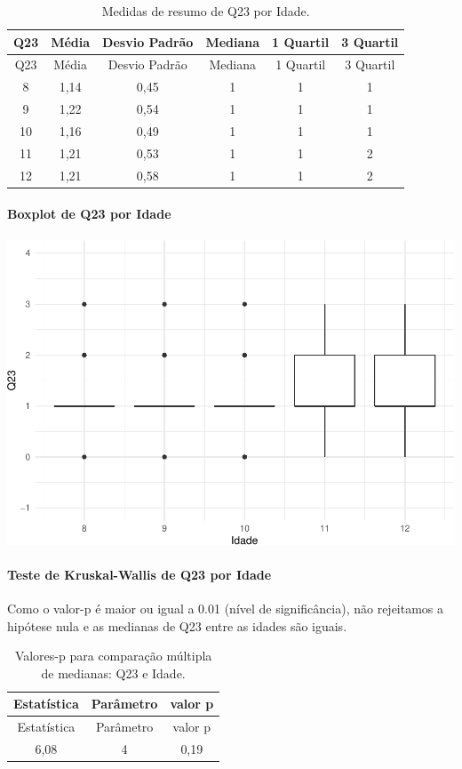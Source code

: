 \documentclass[]{article}
\let\oldparagraph\paragraph
\renewcommand{\paragraph}[1]{\oldparagraph{#1}\mbox{}}
\begin{document}
\begin{longtable}[]{@{}cccccc@{}}
\caption{\label{tab:unnamed-chunk-568}Medidas de resumo de Q23 por Idade.}\tabularnewline
\toprule
Q23 & Média & Desvio Padrão & Mediana & 1 Quartil & 3 Quartil\tabularnewline
\midrule
\endfirsthead
\toprule
Q23 & Média & Desvio Padrão & Mediana & 1 Quartil & 3 Quartil\tabularnewline
\midrule
\endhead
8 & 1,14 & 0,45 & 1 & 1 & 1\tabularnewline
9 & 1,22 & 0,54 & 1 & 1 & 1\tabularnewline
10 & 1,16 & 0,49 & 1 & 1 & 1\tabularnewline
11 & 1,21 & 0,53 & 1 & 1 & 2\tabularnewline
12 & 1,21 & 0,58 & 1 & 1 & 2\tabularnewline
\bottomrule
\end{longtable}

\hypertarget{boxplot-de-q23-por-idade}{%
\paragraph{Boxplot de Q23 por Idade}\label{boxplot-de-q23-por-idade}}

\begin{center}\includegraphics[width=0.75\linewidth]{relatorio_covid19_files/figure-latex/unnamed-chunk-569-1} \end{center}

\hypertarget{teste-de-kruskal-wallis-de-q23-por-idade}{%
\paragraph{Teste de Kruskal-Wallis de Q23 por Idade}\label{teste-de-kruskal-wallis-de-q23-por-idade}}

Como o valor-p é maior ou igual a 0.01 (nível de significância), não rejeitamos a hipótese nula e as medianas de Q23 entre as idades são iguais.

\begin{longtable}[]{@{}ccc@{}}
\caption{\label{tab:unnamed-chunk-571}Valores-p para comparação múltipla de medianas: Q23 e Idade.}\tabularnewline
\toprule
Estatística & Parâmetro & valor p\tabularnewline
\midrule
\endfirsthead
\toprule
Estatística & Parâmetro & valor p\tabularnewline
\midrule
\endhead
6,08 & 4 & 0,19\tabularnewline
\bottomrule
\end{longtable}
\end{document}
